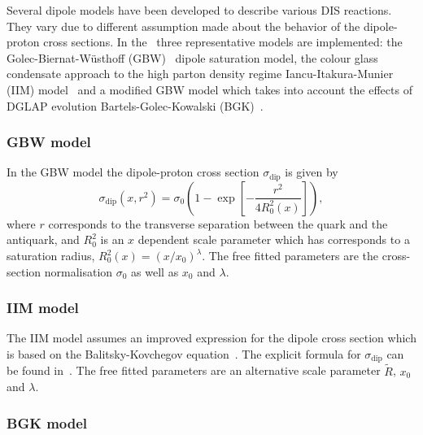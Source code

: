 Several dipole models have been developed to describe various DIS reactions. 
They vary due to different assumption made about the behavior of the dipole-proton cross sections.   
In the \fitter\  three representative models  are implemented:
the Golec-Biernat-W\"usthoff (GBW)~\cite{Golec-Biernat:1998js} 
dipole saturation model,
the colour glass condensate approach to the high parton density 
regime Iancu-Itakura-Munier (IIM) model~\cite{Iancu:2003ge} and 
a modified GBW model which takes into account the effects of  
DGLAP evolution Bartels-Golec-Kowalski (BGK)~\cite{Bartels:2002cj}.

\subsubsection{GBW model}

In the GBW model the dipole-proton cross section $\sigma_{\text{dip}}$ is given by
\begin{equation}
\label{eGBW}
   \sigma_{\text{dip}}(x,r^{2}) = \sigma_{0} \left(1 - \exp \left[-\frac{r^{2}}{4R_{0}^{2}(x)} \right]\right),
\end{equation}
where $r$ corresponds to the transverse separation between the quark and the antiquark, and $R_{0}^{2}$
 is 
an $x$ dependent scale parameter which has corresponds to a saturation radius,  $R_{0}^{2}(x)=\left(x/x_{0}\right)^{\lambda}$.
The free fitted parameters are the cross-section normalisation $\sigma_{0}$ as well as $x_{0}$ and $\lambda$.

\subsubsection{IIM model}

The IIM model assumes an improved expression for the dipole cross section which is based on the 
Balitsky-Kovchegov equation~\cite{Balitsky:1995ub}. The explicit formula for $\sigma_{\text{dip}}$ 
can be found in~\cite{Iancu:2003ge}. The free fitted parameters are an alternative scale parameter $\tilde{R}$, $x_{0}$ and $\lambda$.

\subsubsection{BGK model}

